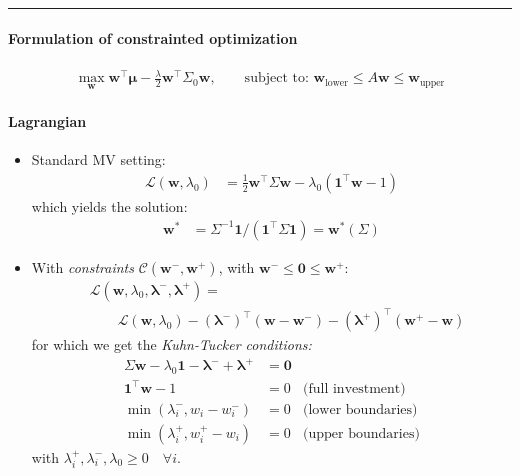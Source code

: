 \documentclass[a4paper,landscape,8pt,fleqn]{scrartcl}
\begin{document}
\begin{multicols*}{3}
\rule{\columnwidth}{0.4pt}

\paragraph{Formulation of constrainted optimization}
\begin{align*}
\max_{\bm w} \bm w^\top \bm \mu - \frac{\lambda}{2} \bm w^\top \Sigma_0 \bm w, \qquad \text{subject to: } \bm w_\text{lower} \leq A \bm w \leq \bm w_\text{upper}
\end{align*}

\paragraph{Lagrangian}
\begin{itemize}
\item Standard MV setting:
\begin{align*}
\mathcal{L}(\bm w,\lambda_0) &= \frac{1}{2} \bm w^\top \Sigma \bm w - \lambda_0 (\bm 1^\top \bm w - 1)
\end{align*}
which yields the solution:
\begin{align*}
\bm w^\ast &= \Sigma^{-1} \bm 1 / (\bm 1^\top \Sigma \bm 1) = \bm w^\ast(\Sigma)
\end{align*}
\item With \textit{constraints} $\mathcal{C}(\bm w^-, \bm w^+)$, with $\bm w^- \leq \bm 0 \leq \bm w^+$:
\begin{align*}
&\mathcal{L}(\bm w,\lambda_0, \bm \lambda^-, \bm \lambda^+) = \\
&\qquad \mathcal{L}(\bm w, \lambda_0) - (\bm \lambda^-)^\top (\bm w - \bm w^-) - (\bm \lambda^+)^\top (\bm w^+ - \bm w)
\end{align*}
for which we get the \textit{Kuhn-Tucker conditions:}
\begin{align*}
\Sigma \bm w - \lambda_0 \bm 1 - \bm \lambda^- + \bm \lambda^+ &= \bm 0 \\
\bm 1^\top \bm w - 1 &= 0 & \text{(full investment)} \\
\min(\lambda_i^-, w_i - w_i^-) &= 0 & \text{(lower boundaries)} \\
\min(\lambda_i^+, w_i^+ - w_i) &= 0 & \text{(upper boundaries)}
\end{align*}
with $\lambda_i^+, \lambda_i^-, \lambda_0 \geq 0 \quad \forall i$.
\end{itemize}


\end{multicols*}
\end{document}
